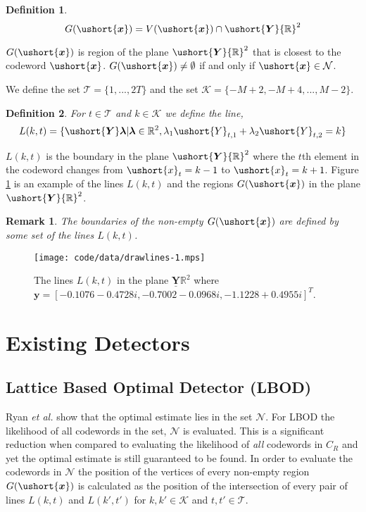 \documentclass[conference]{IEEEtran}
\newtheorem{definition}{Definition}
\newtheorem{remark}{Remark}
\newcommand{\reals}{{\mathbb R}}
\newcommand{\uY}{\ushort{\bm{Y}}}
\newcommand{\ueY}{\ushort{Y}}
\newcommand{\ux}{\ushort{\bm{x}}}
\newcommand{\uex}{\ushort{x}}
\begin{document}
\begin{definition} \label{G}
\[
G(\ux) = V(\ux) \cap \uY\reals^2
\]
\end{definition}

$G(\ux)$ is region of the plane $\uY\reals^2$ that is closest to the codeword $\ux$.  $G(\ux) \neq \emptyset$ if and only if $\ux \in {\mathcal N}$.  %

We define the set ${\mathcal T} = \{1,...,2T\}$ and the set ${\mathcal K} = \{-M+2,-M+4,...,M-2\}$.

\begin{definition}
For $t \in {\mathcal T}$ and $k \in {\mathcal K}$ we define the line,
\[
L(k,t) = \{\uY\bm{\lambda} | \bm{\lambda} \in \reals^2, \lambda_1\ueY_{t,1} + \lambda_2\ueY_{t,2} = k\}
\]
\end{definition}

$L(k,t)$ is the boundary in the plane $\uY\reals^2$ where the $t$th element in the codeword changes from $\uex_t = k-1$ to $\uex_t = k+1$.  Figure \ref{fig_lines} is an example of the lines $L(k,t)$ and the regions $G(\ux)$ in the plane $\uY\reals^2$.

\begin{remark} \label{Gx_and_L}
The boundaries of the non-empty $G(\ux)$ are defined by some set of the lines $L(k,t)$.
\end{remark}

\begin{figure}[htb]
	\centering
		\texttt{[image: code/data/drawlines-1.mps]}
		\caption{The lines $L(k,t)$ in the plane $\underline{\bm{Y}} \reals^2$ where $\bm{y} =
[-0.1076 - 0.4728i, -0.7002 - 0.0968i, -1.1228 + 0.4955i]^T$. }
		\label{fig_lines}
\end{figure}

\section{Existing Detectors} \label{existingest}

\subsection{Lattice Based Optimal Detector (LBOD)} \label{T3optimal}

Ryan \emph{et al.} \cite{Ryan2007} show that the optimal estimate lies in the set ${\mathcal N}$.  For LBOD the likelihood of all codewords in the set, ${\mathcal N}$ is evaluated.  This is a significant reduction when compared to evaluating the likelihood of \emph{all} codewords in $C_R$ and yet the optimal estimate is still guaranteed to be found.  In order to evaluate the codewords in ${\mathcal N}$ the position of the vertices of every non-empty region $G(\ux)$ is calculated as the position of the intersection of every pair of lines $L(k,t)$ and $L(k',t')$ for $k,k' \in {\mathcal K}$ and $t,t' \in {\mathcal T}$.
\end{document}
